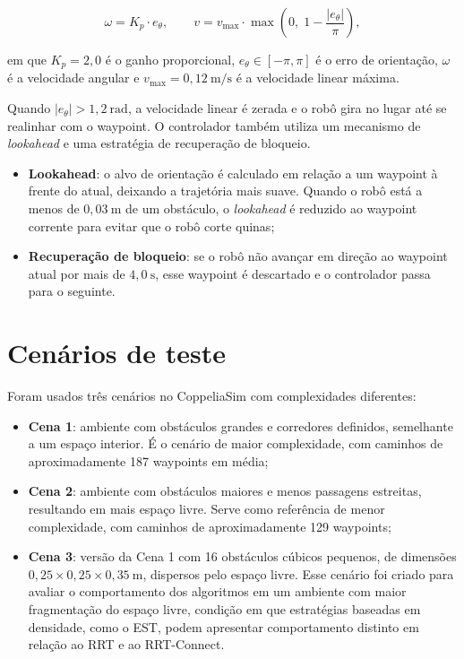 \begin{equation}
    \omega = K_p \cdot e_\theta, \qquad
    v = v_{\max} \cdot \max\!\left(0,\;1 - \frac{|e_\theta|}{\pi}\right),
    \label{eq:controlador}
\end{equation}

em que $K_p = 2{,}0$ é o ganho proporcional, $e_\theta \in [-\pi,\pi]$ é o erro de orientação, $\omega$ é a velocidade angular e $v_{\max} = 0{,}12~\text{m/s}$ é a velocidade linear máxima.

Quando $|e_\theta| > 1{,}2~\text{rad}$, a velocidade linear é zerada e o robô gira no lugar até se realinhar com o waypoint. O controlador também utiliza um mecanismo de \emph{lookahead} e uma estratégia de recuperação de bloqueio.

\begin{itemize}
    \item \textbf{Lookahead}: o alvo de orientação é calculado em relação a um waypoint à frente do atual, deixando a trajetória mais suave. Quando o robô está a menos de $0{,}03~\text{m}$ de um obstáculo, o \emph{lookahead} é reduzido ao waypoint corrente para evitar que o robô corte quinas;

    \item \textbf{Recuperação de bloqueio}: se o robô não avançar em direção ao waypoint atual por mais de $4{,}0~\text{s}$, esse waypoint é descartado e o controlador passa para o seguinte.
\end{itemize}

\section{Cenários de teste}
\label{sec:cenarios_teste}

Foram usados três cenários no CoppeliaSim com complexidades diferentes:

\begin{itemize}
    \item \textbf{Cena 1}: ambiente com obstáculos grandes e corredores definidos, semelhante a um espaço interior. É o cenário de maior complexidade, com caminhos de aproximadamente 187 waypoints em média;

    \item \textbf{Cena 2}: ambiente com obstáculos maiores e menos passagens estreitas, resultando em mais espaço livre. Serve como referência de menor complexidade, com caminhos de aproximadamente 129 waypoints;

    \item \textbf{Cena 3}: versão da Cena 1 com 16 obstáculos cúbicos pequenos, de dimensões $0{,}25 \times 0{,}25 \times 0{,}35~\text{m}$, dispersos pelo espaço livre. Esse cenário foi criado para avaliar o comportamento dos algoritmos em um ambiente com maior fragmentação do espaço livre, condição em que estratégias baseadas em densidade, como o EST, podem apresentar comportamento distinto em relação ao RRT e ao RRT-Connect.
\end{itemize}

